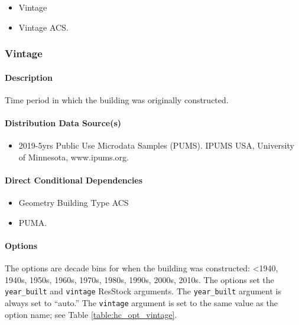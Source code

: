 \begin{itemize}
    \item Vintage
    \item Vintage ACS.
\end{itemize}

\subsubsection{Vintage}
\paragraph{Description}
Time period in which the building was originally constructed.

\paragraph{Distribution Data Source(s)}
\begin{itemize}
    \item 2019-5yrs Public Use Microdata Samples (PUMS). IPUMS USA, University of Minnesota, www.ipums.org.
\end{itemize}

\paragraph{Direct Conditional Dependencies}
\begin{itemize}
    \item Geometry Building Type ACS
    \item PUMA.
\end{itemize}

\paragraph{Options}
The options are decade bins for when the building was constructed: <1940, 1940s, 1950s, 1960s, 1970s, 1980s, 1990s, 2000s, 2010s. The options set the \texttt{year\_built} and \texttt{vintage} ResStock arguments. The \texttt{year\_built} argument is always set to ``auto.'' The \texttt{vintage} argument is set to the same value as the option name; see Table \ref{table:hc_opt_vintage}.

